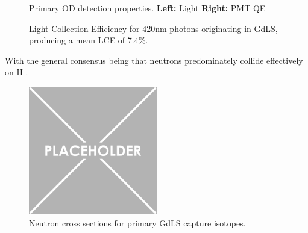 \begin{figure}[!htbp]%
\centering
{}
\caption{Primary OD detection properties. 
\textbf{Left:} Light 
\textbf{Right:} PMT QE
}
\label{fig:od_detection_properties}
\end{figure}


\begin{figure}[!htbp]
\centering
\resizebox{\textwidth}{!}{

}
\caption{Light Collection Efficiency for 420nm photons originating in GdLS, producing a mean LCE of 7.4\%.}
\label{fig:od_lce}
\end{figure}

\par
With the general consensus being that neutrons predominately collide effectively on H \cite{neutron_thermalisation_and_capture_ref}.


\begin{figure}
    \centering
    \includegraphics[width=0.5\textwidth]{Figures/Placeholder.png}
    \caption{Neutron cross sections for primary GdLS capture isotopes.}
    \label{fig:GdLS_capture_cross_section}
\end{figure}


